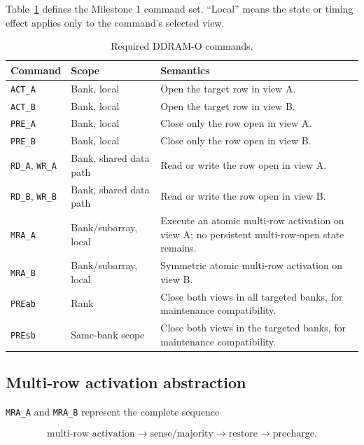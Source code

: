 \documentclass[9pt,twocolumn]{extarticle}
\newcommand{\cmd}[1]{\texttt{#1}}
\newcommand{\viewA}{\textsf{A}}
\newcommand{\viewB}{\textsf{B}}
\begin{document}
Table~\ref{tab:commands} defines the Milestone 1 command set. ``Local'' means
the state or timing effect applies only to the command's selected view.

\begin{table}[t]
\centering
\caption{Required DDRAM-O commands.}
\label{tab:commands}
\begin{tabularx}{\textwidth}{@{}p{}p{}X@{}}
\toprule
Command & Scope & Semantics \\
\midrule
\rowcolor{DDRAMGrey}\cmd{ACT\_A} & Bank, local & Open the target row in view \viewA{}. \\
\cmd{ACT\_B} & Bank, local & Open the target row in view \viewB{}. \\
\rowcolor{DDRAMGrey}\cmd{PRE\_A} & Bank, local & Close only the row open in view \viewA{}. \\
\cmd{PRE\_B} & Bank, local & Close only the row open in view \viewB{}. \\
\rowcolor{DDRAMGrey}\cmd{RD\_A}, \cmd{WR\_A} & Bank, shared data path & Read or write the row open in view \viewA{}. \\
\cmd{RD\_B}, \cmd{WR\_B} & Bank, shared data path & Read or write the row open in view \viewB{}. \\
\rowcolor{DDRAMGrey}\cmd{MRA\_A} & Bank/subarray, local & Execute an atomic multi-row activation on view \viewA{}; no persistent multi-row-open state remains. \\
\cmd{MRA\_B} & Bank/subarray, local & Symmetric atomic multi-row activation on view \viewB{}. \\
\rowcolor{DDRAMGrey}\cmd{PREab} & Rank & Close both views in all targeted banks, for maintenance compatibility. \\
\cmd{PREsb} & Same-bank scope & Close both views in the targeted banks, for maintenance compatibility. \\
\bottomrule
\end{tabularx}
\end{table}

\subsection{Multi-row activation abstraction}

\cmd{MRA\_A} and \cmd{MRA\_B} represent the complete sequence

\begin{equation}
  \text{multi-row activation}
  \rightarrow \text{sense/majority}
  \rightarrow \text{restore}
  \rightarrow \text{precharge}.
\end{equation}
\end{document}
